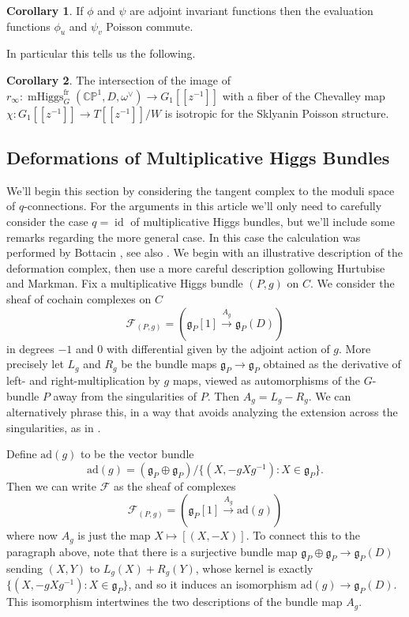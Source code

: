 \documentclass[11pt, oneside, reqno]{amsart}
\theoremstyle{definition} \newtheorem{definition}{Definition}[section]
\newtheorem{corollary}[definition]{Corollary}
\theoremstyle{definition} \newtheorem{remark}[definition]{Remark}
\theoremstyle{definition} \newtheorem{remarks}[definition]{Remarks}
\theoremstyle{definition} \newtheorem{question}[definition]{Question}
\theoremstyle{definition} \newtheorem*{note}{Note}
\theoremstyle{definition} \newtheorem{example}[definition]{Example}
\theoremstyle{definition} \newtheorem{examples}[definition]{Examples}
\renewcommand{\gg}{\mathfrak{g}}
\newcommand{\bb}[1]{\mathbb{#1}}
\newcommand{\mr}[1]{\mathrm{#1}}
\newcommand{\mc}[1]{\mathcal{#1}}
\DeclareMathOperator{\id}{id}
\DeclareMathOperator{\mhiggs}{mHiggs}
\newcommand{\fr}{\mathrm{fr}}
\newcommand{\ad}{\mr{ad}}
\begin{document}
\begin{corollary}\label{cor:poisson-commuting}
  If $\phi$ and $\psi$ are adjoint invariant functions then the evaluation functions $\phi_u$ and $\psi_v$ Poisson commute.
\end{corollary}

In particular this tells us the following.

\begin{corollary}\label{isotropic_fiber_cor}
The intersection of the image of $r_\infty \colon \mhiggs^\fr_G(\bb{CP}^1, D, \omega^\vee) \to G_1[[z^{-1}]]$ with a fiber of the Chevalley map $\chi \colon G_1[[z^{-1}]] \to T[[z^{-1}]]/W$ is isotropic for the Sklyanin Poisson structure.
\end{corollary}

\subsection{Deformations of Multiplicative Higgs Bundles} \label{def_section}
We'll begin this section by considering the tangent complex to the moduli space of $q$-connections.  For the arguments in this article we'll only need to carefully consider the case $q=\id$ of multiplicative Higgs bundles, but we'll include some remarks regarding the more general case.  In this case the calculation was performed by Bottacin \cite{Bottacin}, see also \cite[Section 4]{HurtubiseMarkman}. We begin with an illustrative description of the deformation complex, then use a more careful description gollowing Hurtubise and Markman.  Fix a multiplicative Higgs bundle $(P,g)$ on $C$.  We consider the sheaf of cochain complexes on $C$
\[\mc F_{(P,g)} = (\gg_P[1] \overset {A_g} {\to} \gg_P(D))\]
in degrees $-1$ and 0 with differential given by the adjoint action of $g$.  More precisely let $L_g$ and $R_g$ be the bundle maps $\gg_P \to \gg_P$ obtained as the derivative of left- and right-multiplication by $g$ maps, viewed as automorphisms of the $G$-bundle $P$ away from the singularities of $P$.  Then $A_g = L_g - R_g$.  We can alternatively phrase this, in a way that avoids analyzing the extension across the singularities, as in \cite[Section 4]{HurtubiseMarkman}.  
 
Define $\ad(g)$ to be the vector bundle
\[\ad(g) = (\gg_P \oplus \gg_P)/\{(X, -g X g^{-1}): X \in \gg_P\}.\]
Then we can write $\mc F$ as the sheaf of complexes
\[\mc F_{(P,g)} = (\gg_P[1] \overset {A_g} {\to} \ad(g))\]
where now $A_g$ is just the map $X \mapsto [(X,-X)]$.  To connect this to the paragraph above, note that there is a surjective bundle map $\gg_P \oplus \gg_P \to \gg_P(D)$ sending $(X,Y)$ to $L_g(X) + R_g(Y)$, whose kernel is exactly $\{(X, -g X g^{-1}): X \in \gg_P\}$, and so it induces an isomorphism $\ad(g) \to \gg_P(D)$.  This isomorphism intertwines the two descriptions of the bundle map $A_g$.
\end{document}
